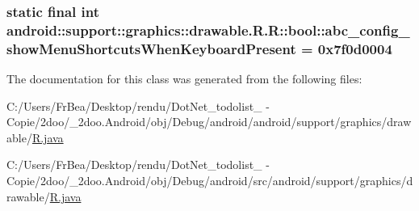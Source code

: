 \hypertarget{classandroid_1_1support_1_1graphics_1_1drawable_1_1_r_1_1bool_242da510e10d5409e2a81311ba2ebb9d}{
\subsubsection[{abc\_\-config\_\-showMenuShortcutsWhenKeyboardPresent}]{\setlength{\rightskip}{0pt plus 5cm}static final int android::support::graphics::drawable.R.R::bool::abc\_\-config\_\-showMenuShortcutsWhenKeyboardPresent = 0x7f0d0004}}
\label{classandroid_1_1support_1_1graphics_1_1drawable_1_1_r_1_1bool_242da510e10d5409e2a81311ba2ebb9d}




The documentation for this class was generated from the following files:\begin{CompactItemize}
\item 
C:/Users/FrBea/Desktop/rendu/DotNet\_\-todolist\_ - Copie/2doo/\_\-2doo.Android/obj/Debug/android/android/support/graphics/drawable/\hyperlink{android_2support_2graphics_2drawable_2_r_8java}{R.java}\item 
C:/Users/FrBea/Desktop/rendu/DotNet\_\-todolist\_ - Copie/2doo/\_\-2doo.Android/obj/Debug/android/src/android/support/graphics/drawable/\hyperlink{src_2android_2support_2graphics_2drawable_2_r_8java}{R.java}\end{CompactItemize}

